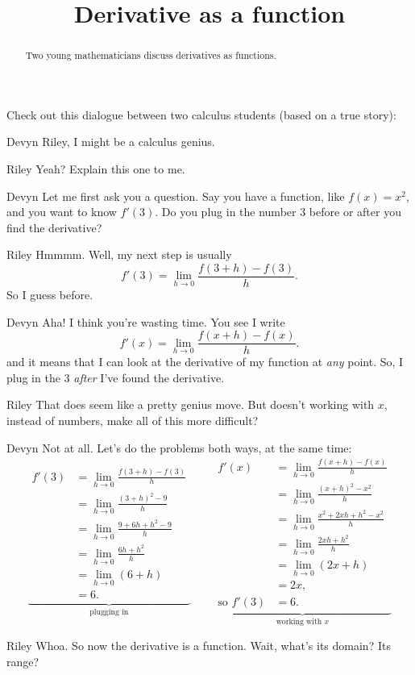 \documentclass{ximera}
\title[Break-Ground:]{Derivative as a function}
\begin{document}
\begin{abstract}
Two young mathematicians discuss derivatives as
functions.
\end{abstract}
\maketitle

Check out this dialogue between two calculus students (based on a true
story):

\begin{dialogue}
\item[Devyn] Riley, I might be a calculus genius.
\item[Riley] Yeah?  Explain this one to me.
\item[Devyn] Let me first ask you a question.  Say you have a function, like 
 $f(x) = x^2$, and you want to know $f'(3)$.  Do
  you plug in the number $3$ before or after you find the derivative?
\item[Riley] Hmmmm. Well, my next step is usually
  \[
  f'(3) = \lim_{h\to 0}\frac{f(3+h)-f(3)}{h}.
  \]
  So I guess before.
\item[Devyn] Aha!  I think you're wasting time. You see I write
  \[
  f'(x) = \lim_{h\to 0}\frac{f(x+h)-f(x)}{h}.
  \]
  and it means that I can look at the derivative of my function at
  \textit{any} point.  So, I plug in the $3$ {\em after} I've found the derivative.
\item[Riley] That does seem like a pretty genius move. But doesn't working
 with $x$, instead of numbers, make all of this more difficult?
\item[Devyn] Not at all. Let's do the problems both ways, at the same time:
  \[
 \underbrace{\begin{aligned}
    f'(3) &= \lim_{h\to 0}\frac{f(3+h)-f(3)}{h}\\
    &= \lim_{h\to 0}\frac{(3+h)^2-9}{h}\\
    &= \lim_{h\to 0}\frac{9+6h+h^2-9}{h}\\
    &= \lim_{h\to 0}\frac{6h+h^2}{h}\\
    &= \lim_{h\to 0}(6+h)\\
    &= 6.
  \end{aligned}}_{\text{plugging in}}
  \qquad
  \underbrace{\begin{aligned}
    f'(x) &= \lim_{h\to 0}\frac{f(x+h)-f(x)}{h}\\
    &= \lim_{h\to 0}\frac{(x+h)^2-x^2}{h}\\
    &= \lim_{h\to 0}\frac{x^2+2xh+h^2-x^2}{h}\\
    &= \lim_{h\to 0}\frac{2xh+h^2}{h}\\
    &= \lim_{h\to 0}(2x+h)\\
    &= 2x,\\
    \text{so }f'(3) &=6. 
  \end{aligned}}_{\text{working with $x$}}
  \]
  \item[Riley] Whoa. So now the derivative is a function. Wait, what's
    its domain? Its range?
\end{dialogue}
\end{document}
